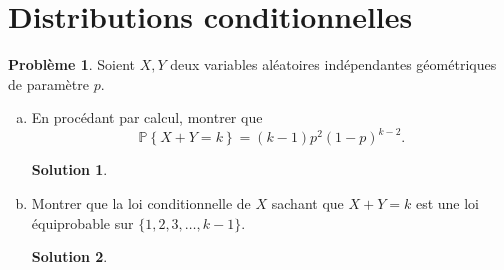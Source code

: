 \documentclass[11pt]{amsart}
\theoremstyle{definition}
\newtheorem{probleme}{Problème}
\newtheorem*{solution}{Solution}
\theoremstyle{remark}
\numberwithin{equation}{section}
\newcommand{\PR} {\mathbb P}
\newcommand{\ac}[1]{\left\{ #1 \right\}} %
\newcommand \1 {\mathbbm 1}
\begin{document}
	\vspace{0.5cm}
	
	\newpage
	\section{Distributions conditionnelles}
	
	\begin{probleme}
		Soient $X, Y$ deux variables aléatoires indépendantes géométriques de paramètre $p$.
		\begin{enumerate}[(a)]
			\item En procédant par calcul, montrer que
			$$\PR \ac{X + Y = k} = (k-1)p^2 (1-p)^{k-2}.$$
		
		\begin{solution}
		\end{solution}
		\vspace{0.3cm}
		
			
			\item Montrer que la loi conditionnelle de $X$ sachant que $X+Y = k$
			est une loi équiprobable sur $\{1, 2, 3, \dots, k-1\}$.
		
		\begin{solution}
		\end{solution}
		\vspace{0.3cm}
		
			
		\end{enumerate}
	\end{probleme}
	\vspace{0.5cm}
	
\end{document}
